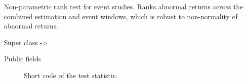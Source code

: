 \documentclass[a4paper]{book}
\begin{document}
%
\begin{Description}
Non-parametric rank test for event studies. Ranks abnormal returns
across the combined estimation and event windows, which is robust
to non-normality of abnormal returns.
\end{Description}
%
\begin{Section}{Super class}
 -> 
\end{Section}
%
\begin{Section}{Public fields}

\begin{description}

\item[] Short code of the test statistic.

\end{description}


\end{Section}
%
\end{document}
